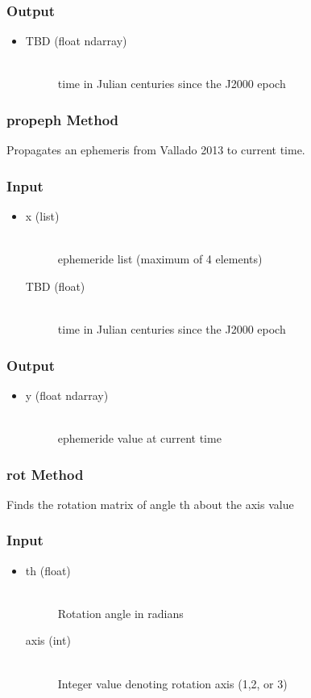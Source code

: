 \documentclass[cleanfoot]{asme2ej}
\begin{document}
\subsubsection*{Output}
\begin{itemize}
\item
\begin{description}
    \item[TBD (float ndarray)] \hfill \\ time in Julian centuries since the J2000 epoch 
\end{description}
\end{itemize}

\subsubsection{propeph Method} 
Propagates an ephemeris from Vallado 2013 to current time.
\subsubsection*{Input}
\begin{itemize}
\item
\begin{description}
    \item[x (list)] \hfill \\ ephemeride list (maximum of 4 elements)
    \item[TBD (float)] \hfill \\ time in Julian centuries since the J2000 epoch 
\end{description}
\end{itemize}
\subsubsection*{Output}
\begin{itemize}
\item
\begin{description}
    \item[y (float ndarray)] \hfill \\ ephemeride value at current time
\end{description}
\end{itemize}

\subsubsection{rot Method} 
Finds the rotation matrix of angle th about the axis value
\subsubsection*{Input}
\begin{itemize}
\item
\begin{description}
    \item[th (float)] \hfill \\ Rotation angle in radians
    \item[axis (int)] \hfill \\ Integer value denoting rotation axis (1,2, or 3)
\end{description}
\end{itemize}
\end{document}
